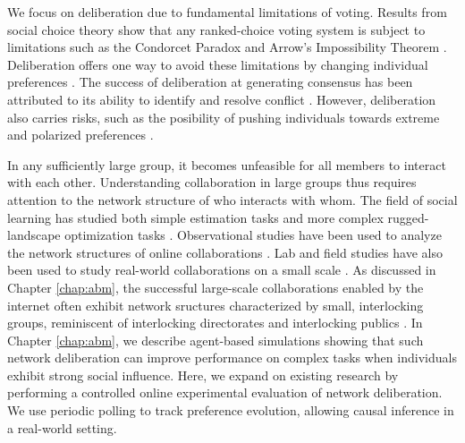 We focus on deliberation due to fundamental limitations of voting.
Results from social choice theory show that any ranked-choice voting system is subject to limitations such as the Condorcet Paradox \cite{condorcet_essay_1785} and Arrow's Impossibility Theorem \cite{arrow_social_2012}.
Deliberation offers one way to avoid these limitations by changing individual preferences \cite{ackerman_deliberation_2002}.
The success of deliberation at generating consensus has been attributed to its ability to identify and resolve conflict \cite{gentry_consensus_1982}.
However, deliberation also carries risks, such as the posibility of pushing individuals towards extreme and polarized preferences \cite{schkade_what_2007}.

In any sufficiently large group, it becomes unfeasible for all members to interact with each other.
Understanding collaboration in large groups thus requires attention to the network structure of who interacts with whom.
The field of social learning has studied both simple estimation tasks \cite{degroot_reaching_1974, golub_naive_2010} and more complex rugged-landscape optimization tasks \cite{lazer_network_2007, barkoczi_social_2016}.
Observational studies have been used to analyze the network structures of online collaborations \cite{gonzalez-bailon_networked_2016, platt_network_2018}.
Lab and field studies have also been used to study real-world collaborations on a small scale \cite{salehi_hive_2018, kearns_experiments_2012}.
As discussed in Chapter \ref{chap:abm}, the successful large-scale collaborations enabled by the internet often exhibit network sructures characterized by small, interlocking groups, reminiscent of interlocking directorates \cite{levine_study_1979} and interlocking publics \cite{habermas_structural_1991}.
In Chapter \ref{chap:abm}, we describe agent-based simulations showing that such network deliberation can improve performance on complex tasks when individuals exhibit strong social influence.
Here, we expand on existing research by performing a controlled online experimental evaluation of network deliberation.
We use periodic polling to track preference evolution, allowing causal inference in a real-world setting.

